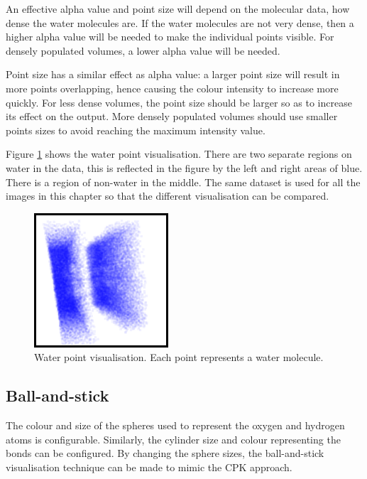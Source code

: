 An effective alpha value and point size will depend on the molecular data, how
dense the water molecules are. If the water molecules are not very dense, then
a higher alpha value will be needed to make the individual points visible. For
densely populated volumes, a lower alpha value will be needed.

Point size has a similar effect as alpha value: a larger point size will result
in more points overlapping, hence causing the colour intensity to increase more
quickly. For less dense volumes, the point size should be larger so as to
increase its effect on the output. More densely populated volumes should use
smaller points sizes to avoid reaching the maximum intensity value.

Figure \ref{fig:implementation_waterpoint} shows the water point visualisation.
There are two separate regions on water in the data, this is reflected in the
figure by the left and right areas of blue. There is a region of non-water in
the middle. The same dataset is used for all the images in this chapter so that
the different visualisation can be compared.

\begin{figure}
  \begin{center}
    \includegraphics[width=50mm]{waterpoint}
  \end{center}
  \caption{Water point visualisation. Each point represents a water molecule.}
  \label{fig:implementation_waterpoint}
\end{figure}


\subsection{Ball-and-stick}
\label{sub:implementation_ballstick}

The colour and size of the spheres used to represent the oxygen and hydrogen
atoms is configurable. Similarly, the cylinder size and colour representing the
bonds can be configured. By changing the sphere sizes, the ball-and-stick
visualisation technique can be made to mimic the CPK approach.

